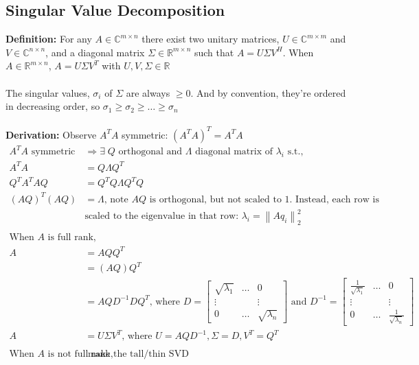 \documentclass{article}
\newcommand{\norm}[2]{\left\lVert#1\right\rVert_#2}
\begin{document}
\subsection{Singular Value Decomposition}
\textbf{Definition:} For any $A \in \mathbb{C}^{m\times n}$ there exist two unitary matrices, $U \in \mathbb{C}^{m \times m}$ and $V \in \mathbb{C}^{n \times n}$, and a diagonal matrix $\Sigma \in \mathbb{R}^{m \times n}$ such that $A = U\Sigma V^H$. When $A \in \mathbb{R}^{m \times n}$, $A = U\Sigma V^T$ with $U, V, \Sigma \in \mathbb{R}$ \\ \\
The singular values, $\sigma_i$ of $\Sigma$ are always $\geq0$. And by convention, they're ordered in decreasing order, so $\sigma_1 \geq \sigma_2 \geq \dots \geq \sigma_n$\\ \\ 
\textbf{Derivation:} Observe $A^TA$ symmetric: $(A^TA)^T = A^TA$
\begin{align*}
    A^TA \textrm{ symmetric} &\Rightarrow \exists \; Q \textrm{ orthogonal and } \Lambda \textrm{ diagonal matrix of $\lambda_i$ s.t., }\\
    A^TA & = Q\Lambda Q^T\\
    Q^TA^TAQ & = Q^TQ\Lambda Q^TQ\\
    (AQ)^T(AQ) & = \Lambda \textrm{, note $AQ$ is orthogonal, but not scaled to 1. Instead, each row is} \\
    &\textrm{scaled to the eigenvalue in that row: }\lambda_i  = \norm{Aq_i}{2}^2\\
    \\
    \textrm{When $A$ is full rank,}&\\
    A &= AQQ^T\\
    &= (AQ) Q^T\\
    &= AQD^{-1}DQ^T \textrm{, where } D = \begin{bmatrix} \sqrt{\lambda_1} & \dots & 0\\ 
        \vdots & & \vdots\\ 0 & \dots & \sqrt{\lambda_n} \end{bmatrix} \textrm{ and } D^{-1} = \begin{bmatrix} \frac{1}{\sqrt{\lambda_1}} & \dots & 0\\ 
        \vdots & & \vdots\\ 0 & \dots & \frac{1}{\sqrt{\lambda_n}} \end{bmatrix}\\
    A &= U\Sigma V^T \textrm{, where } U  = AQD^{-1}, \Sigma = D, V^T = Q^T\\
    \\
    \textrm{When $A$ is not full rank,}&\textrm{ make the tall/thin SVD}
\end{align*}
\end{document}
